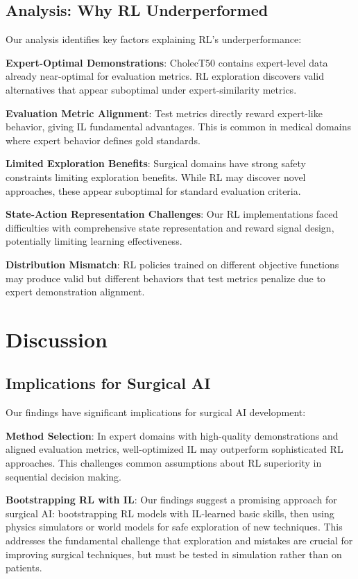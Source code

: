\documentclass[runningheads]{llncs}
\begin{document}
\subsection{Analysis: Why RL Underperformed}

Our analysis identifies key factors explaining RL's underperformance:

\textbf{Expert-Optimal Demonstrations}: CholecT50 contains expert-level data already near-optimal for evaluation metrics. RL exploration discovers valid alternatives that appear suboptimal under expert-similarity metrics.

\textbf{Evaluation Metric Alignment}: Test metrics directly reward expert-like behavior, giving IL fundamental advantages. This is common in medical domains where expert behavior defines gold standards.

\textbf{Limited Exploration Benefits}: Surgical domains have strong safety constraints limiting exploration benefits. While RL may discover novel approaches, these appear suboptimal for standard evaluation criteria.

\textbf{State-Action Representation Challenges}: Our RL implementations faced difficulties with comprehensive state representation and reward signal design, potentially limiting learning effectiveness.

\textbf{Distribution Mismatch}: RL policies trained on different objective functions may produce valid but different behaviors that test metrics penalize due to expert demonstration alignment.

\section{Discussion}

\subsection{Implications for Surgical AI}

Our findings have significant implications for surgical AI development:

\textbf{Method Selection}: In expert domains with high-quality demonstrations and aligned evaluation metrics, well-optimized IL may outperform sophisticated RL approaches. This challenges common assumptions about RL superiority in sequential decision making.

\textbf{Bootstrapping RL with IL}: Our findings suggest a promising approach for surgical AI: bootstrapping RL models with IL-learned basic skills, then using physics simulators or world models for safe exploration of new techniques. This addresses the fundamental challenge that exploration and mistakes are crucial for improving surgical techniques, but must be tested in simulation rather than on patients.
\end{document}
